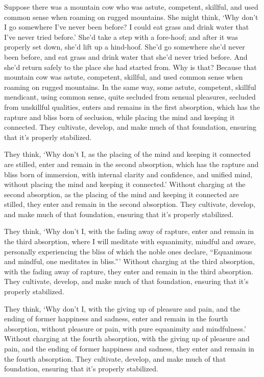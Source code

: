 \documentclass[12pt,openany]{book}%
\begin{document}
Suppose there was a mountain cow who was astute, competent, skillful, and used common sense when roaming on rugged mountains. She might think, ‘Why don’t I go somewhere I’ve never been before? I could eat grass and drink water that I’ve never tried before.’ She’d take a step with a fore-hoof; and after it was properly set down, she’d lift up a hind-hoof. She’d go somewhere she’d never been before, and eat grass and drink water that she’d never tried before. And she’d return safely to the place she had started from. Why is that? Because that mountain cow was astute, competent, skillful, and used common sense when roaming on rugged mountains. In the same way, some astute, competent, skillful mendicant, using common sense, quite secluded from sensual pleasures, secluded from unskillful qualities, enters and remains in the first absorption, which has the rapture and bliss born of seclusion, while placing the mind and keeping it connected. They cultivate, develop, and make much of that foundation, ensuring that it’s properly stabilized. 

They think, ‘Why don’t I, as the placing of the mind and keeping it connected are stilled, enter and remain in the second absorption, which has the rapture and bliss born of immersion, with internal clarity and confidence, and unified mind, without placing the mind and keeping it connected.’ Without charging at the second absorption, as the placing of the mind and keeping it connected are stilled, they enter and remain in the second absorption. They cultivate, develop, and make much of that foundation, ensuring that it’s properly stabilized. 

They think, ‘Why don’t I, with the fading away of rapture, enter and remain in the third absorption, where I will meditate with equanimity, mindful and aware, personally experiencing the bliss of which the noble ones declare, “Equanimous and mindful, one meditates in bliss.”’ Without charging at the third absorption, with the fading away of rapture, they enter and remain in the third absorption. They cultivate, develop, and make much of that foundation, ensuring that it’s properly stabilized. 

They think, ‘Why don’t I, with the giving up of pleasure and pain, and the ending of former happiness and sadness, enter and remain in the fourth absorption, without pleasure or pain, with pure equanimity and mindfulness.’ Without charging at the fourth absorption, with the giving up of pleasure and pain, and the ending of former happiness and sadness, they enter and remain in the fourth absorption. They cultivate, develop, and make much of that foundation, ensuring that it’s properly stabilized. 
\end{document}
